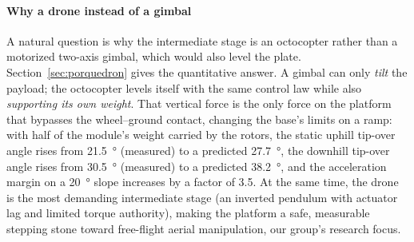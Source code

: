 \paragraph{Why a drone instead of a gimbal}
A natural question is why the intermediate stage is an octocopter rather than a motorized two-axis gimbal, which would also level the plate. Section~\ref{sec:porquedron} gives the quantitative answer. A gimbal can only \emph{tilt} the payload; the octocopter levels itself with the same control law while also \emph{supporting its own weight}. That vertical force is the only force on the platform that bypasses the wheel--ground contact, changing the base's limits on a ramp: with half of the module's weight carried by the rotors, the static uphill tip-over angle rises from \SI{21.5}{\degree} (measured) to a predicted \SI{27.7}{\degree}, the downhill tip-over angle rises from \SI{30.5}{\degree} (measured) to a predicted \SI{38.2}{\degree}, and the acceleration margin on a \SI{20}{\degree} slope increases by a factor of 3.5. At the same time, the drone is the most demanding intermediate stage (an inverted pendulum with actuator lag and limited torque authority), making the platform a safe, measurable stepping stone toward free-flight aerial manipulation, our group's research focus.

